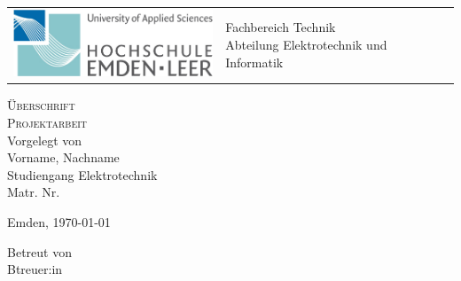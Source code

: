 \begin{titlepage}

\vspace{-0.5cm}
\hspace{-3.0cm}
\begin{tabular}{p{8.0cm} p{8.0cm}}
  \includegraphics[width = 6.0cm]{img/hsel-allgemein} &
   \parbox[b]{8.0cm}{
     {\large 	Fachbereich Technik }\\
     {\large 	Abteilung Elektrotechnik und Informatik }     
    } \\
   \\
   \hline
\end{tabular}
%
\begin{center}

\vspace{2.5cm}
\LARGE{\textsc{
Überschrift
}}\\

\vspace{2.5cm}
\LARGE{\textsc{
{Projektarbeit}
}}\\

\vspace{2cm}%
\large
Vorgelegt von\\ Vorname, Nachname\\ Studiengang Elektrotechnik\\ Matr. Nr. 

\vspace{1cm} 
Emden, \today

\vspace{3.5cm}%
Betreut von\\ Btreuer:in%

\end{center}
\normalsize
\end{titlepage}
